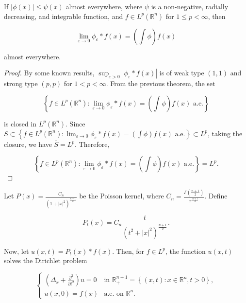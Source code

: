 \begin{theorem}
  If $|\phi(x)| \leqslant \psi(x)$ almost everywhere, where $\psi$ is a non-negative, radially decreasing, and integrable function, and $f \in L^p\left(\mathbb{R}^n\right)$ for $1 \leq p < \infty$, then

$$\lim _{\varepsilon \rightarrow 0} \phi_{\varepsilon} * f(x) = \left(\int \phi\right) f(x)$$

almost everywhere.  
\end{theorem}
\begin{proof}
    By some known results, $\sup _{\varepsilon>0}\left|\phi_{\varepsilon} * f(x)\right|$ is of weak type $(1,1)$ and strong type $(p, p)$ for $1 < p < \infty$.
From the previous theorem, the set

$$\left\{f \in L^p\left(\mathbb{R}^n\right): \lim _{\varepsilon \rightarrow 0} \phi_{\varepsilon} * f(x) = \left(\int \phi\right) f(x) \text{ a.e.}\right\}$$

is closed in $L^p\left(\mathbb{R}^n\right)$.
Since $S \subset \left\{f \in L^p\left(\mathbb{R}^n\right): \lim _{\varepsilon \rightarrow 0} \phi_{\varepsilon} * f(x) = \left(\int \phi\right) f(x) \text{ a.e.}\right\} \subset L^p$,
taking the closure, we have $\bar{S} = L^p$.
Therefore,

$$\left\{f \in L^p\left(\mathbb{R}^n\right): \lim _{\varepsilon \rightarrow 0} \phi_{\varepsilon} * f(x) = \left(\int \phi\right) f(x) \text{ a.e.}\right\} = L^p.$$
\end{proof}
\begin{example}
    Let $P(x) = \frac{C_n}{\left(1 + |x|^2\right)^{\frac{n+1}{2}}}$ be the Poisson kernel, where $C_n = \frac{\Gamma\left(\frac{n+1}{2}\right)}{\pi^{\frac{n+1}{2}}}$.
Define

$$P_t(x) = C_n \frac{t}{\left(t^2 + |x|^2\right)^{\frac{n+1}{2}}}.$$

Now, let $u(x, t) = P_t(x) * f(x)$. Then, for $f \in L^p$, the function $u(x, t)$ solves the Dirichlet problem

$$\begin{cases}
\left(\Delta_x + \frac{\partial^2}{\partial t^2}\right) u = 0 & \text{in } \mathbb{R}_{+}^{n+1} = \left\{(x, t): x \in \mathbb{R}^n, t > 0\right\}, \\
u(x, 0) = f(x) & \text{a.e. on } \mathbb{R}^n.
\end{cases}$$
\end{example}